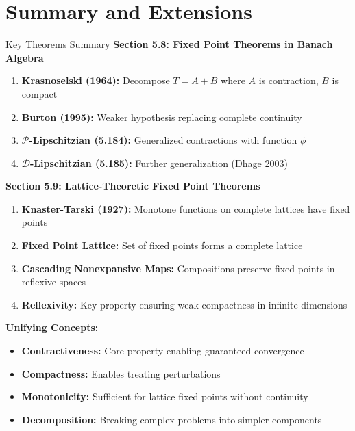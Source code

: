 \documentclass[aspectratio=169,10pt]{beamer}
\begin{document}
\section{Summary and Extensions}

\begin{frame}[allowframebreaks]{Key Theorems Summary}
    \textbf{Section 5.8: Fixed Point Theorems in Banach Algebra}
    \begin{enumerate}
        \item \textbf{Krasnoselski (1964):} Decompose $T = A + B$ where $A$ is contraction, $B$ is compact
        \item \textbf{Burton (1995):} Weaker hypothesis replacing complete continuity
        \item \textbf{$\mathcal{P}$-Lipschitzian (5.184):} Generalized contractions with function $\phi$
        \item \textbf{$\mathcal{D}$-Lipschitzian (5.185):} Further generalization (Dhage 2003)
    \end{enumerate}

    \framebreak

    \textbf{Section 5.9: Lattice-Theoretic Fixed Point Theorems}
    \begin{enumerate}
        \item \textbf{Knaster-Tarski (1927):} Monotone functions on complete lattices have fixed points
        \item \textbf{Fixed Point Lattice:} Set of fixed points forms a complete lattice
        \item \textbf{Cascading Nonexpansive Maps:} Compositions preserve fixed points in reflexive spaces
        \item \textbf{Reflexivity:} Key property ensuring weak compactness in infinite dimensions
    \end{enumerate}

    \framebreak

    \textbf{Unifying Concepts:}
    \begin{itemize}
        \item \textbf{Contractiveness:} Core property enabling guaranteed convergence
        \item \textbf{Compactness:} Enables treating perturbations
        \item \textbf{Monotonicity:} Sufficient for lattice fixed points without continuity
        \item \textbf{Decomposition:} Breaking complex problems into simpler components
    \end{itemize}
\end{frame}
\end{document}
